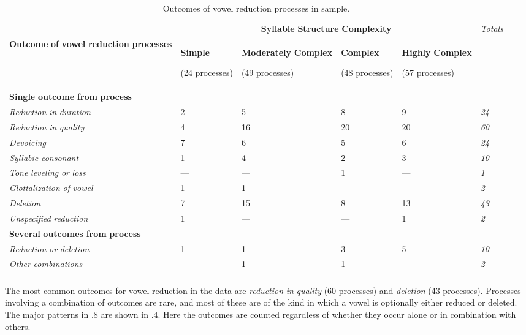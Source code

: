 \begin{table}
\begin{tabularx}{\textwidth}{XXXXXX}
\lsptoprule
 & \multicolumn{4}{c}{ \textbf{Syllable} \textbf{Structure} \textbf{Complexity}} & \textit{Totals}\\
 \textbf{Outcome} \textbf{of} \textbf{vowel} \textbf{reduction} \textbf{processes} & { \textbf{Simple}}

 (24 processes) & { \textbf{Moderately} \textbf{Complex}}

 (49 processes) & { \textbf{Complex}}

 (48 processes) & { \textbf{Highly} \textbf{Complex}}

 (57 processes) & \\
 \textbf{Single} \textbf{outcome} \textbf{from} \textbf{process} & \multicolumn{5}{c}{}\\
 \textit{Reduction} \textit{in} \textit{duration} & 2 & 5 & 8 & 9 & \textit{24}\\
 \textit{Reduction} \textit{in} \textit{quality} & 4 & 16 & 20 & 20 & \textit{60}\\
 \textit{Devoicing} & 7 & 6 & 5 & 6 & \textit{24}\\
 \textit{Syllabic} \textit{consonant} & 1 & 4 & 2 & 3 & \textit{10}\\
 \textit{Tone} \textit{leveling} \textit{or} \textit{loss} & — & — & 1 & — & \textit{1}\\
 \textit{Glottalization} \textit{of} \textit{vowel} & 1 & 1 & — & — & \textit{2}\\
 \textit{Deletion} & 7 & 15 & 8 & 13 & \textit{43}\\
 \textit{Unspecified} \textit{reduction} & 1 & — & — & 1 & \textit{2}\\
 \textbf{Several} \textbf{outcomes} \textbf{from} \textbf{process} & \multicolumn{5}{c}{}\\
 \textit{Reduction} \textit{or} \textit{deletion} & 1 & 1 & 3 & 5 & \textit{10}\\
 \textit{Other} \textit{combinations} & — & 1 & 1 & — & \textit{2}\\
\lspbottomrule
\end{tabularx}
\caption{\label{6.8}Outcomes of vowel reduction processes in sample.}
\end{table}




  The most common outcomes for vowel reduction in the data are \textit{reduction} \textit{in} \textit{quality} (60 processes) and \textit{deletion} (43 processes). Processes involving a combination of outcomes are rare, and most of these are of the kind in which a vowel is optionally either reduced or deleted. The major patterns in .8 are shown in .4. Here the outcomes are counted regardless of whether they occur alone or in combination with others.





